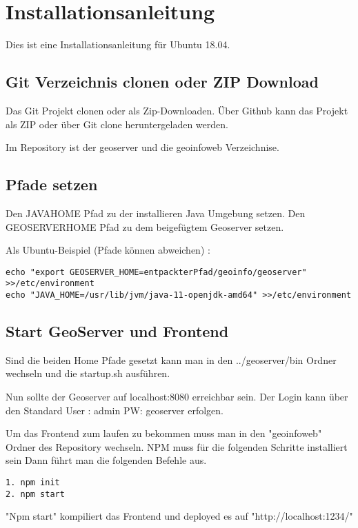 \section{Installationsanleitung}
Dies ist eine Installationsanleitung für Ubuntu 18.04.
\subsection{Git Verzeichnis clonen oder ZIP Download}
Das Git Projekt clonen oder als Zip-Downloaden.
Über Github kann das Projekt als ZIP oder über Git clone heruntergeladen werden.

Im Repository ist der geoserver und die geoinfoweb Verzeichnise. 

\subsection{Pfade setzen}
Den JAVAHOME Pfad zu der installieren Java Umgebung setzen.
Den GEOSERVERHOME Pfad zu dem beigefügtem Geoserver setzen.

Als Ubuntu-Beispiel (Pfade können abweichen) :
\begin{lstlisting}[frame=single,basicstyle=\small]
echo "export GEOSERVER_HOME=entpackterPfad/geoinfo/geoserver" >>/etc/environment
echo "JAVA_HOME=/usr/lib/jvm/java-11-openjdk-amd64" >>/etc/environment
\end{lstlisting}


\subsection{Start GeoServer und Frontend}
Sind die beiden Home Pfade gesetzt kann man in den ../geoserver/bin Ordner wechseln und die startup.sh ausführen.


Nun sollte der Geoserver auf localhost:8080 erreichbar sein.
Der Login kann über den Standard User : admin
PW: geoserver erfolgen.


Um das Frontend zum laufen zu bekommen muss man in den "geoinfoweb" Ordner des Repository wechseln.
 NPM muss für die folgenden Schritte installiert sein
Dann führt man die folgenden Befehle aus.
\begin{lstlisting}[frame=single,basicstyle=\small]
1. npm init
2. npm start
\end{lstlisting}
 "Npm start" kompiliert das Frontend und deployed es auf "http://localhost:1234/"
 
